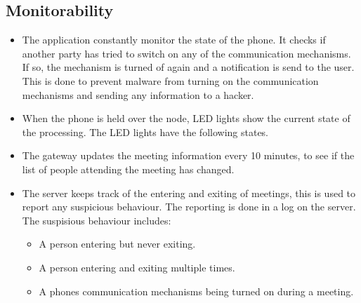 \subsection{Monitorability}
\begin{itemize}
\item  The application constantly monitor the state of the phone. It checks if another party has tried to switch on any of the communication mechanisms. If so, the mechanism is turned of again and a notification is send to the user. This is done to prevent malware from turning on the communication mechanisms and sending any information to a hacker. 
\item When the phone is held over the node, LED lights show the current state of the processing. The LED lights have the following states.
\item The gateway updates the meeting information every 10 minutes, to see if the list of people attending the meeting has changed.
\item The server keeps track of the entering and exiting of meetings, this is used to report any suspicious behaviour. The reporting is done in a log on the server. The suspisious behaviour includes: 
\begin{itemize}
\item A person entering but never exiting.
\item A person entering and exiting multiple times.
\item A phones communication mechanisms being turned on during a meeting.
\end{itemize}
\end{itemize}

